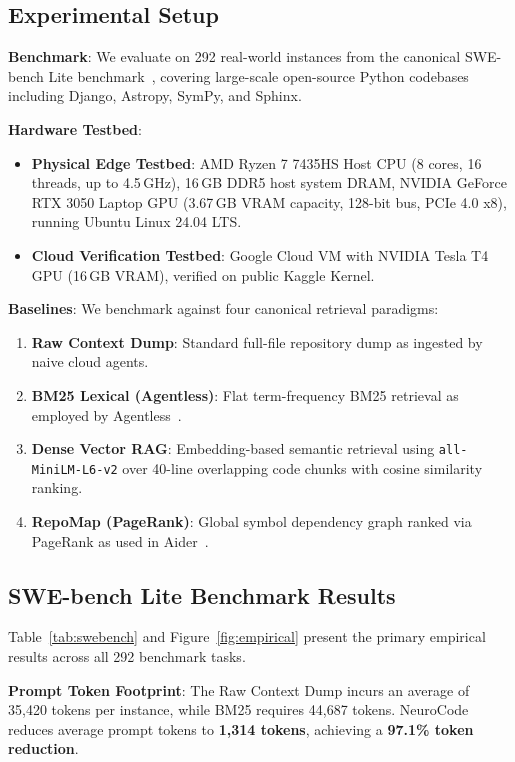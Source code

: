 \documentclass[journal]{IEEEtran}
\begin{document}
\subsection{Experimental Setup}

\textbf{Benchmark}: We evaluate on 292 real-world instances from the canonical SWE-bench Lite benchmark~\cite{jimenez2024swebench}, covering large-scale open-source Python codebases including Django, Astropy, SymPy, and Sphinx.

\textbf{Hardware Testbed}:
\begin{itemize}
    \item \textbf{Physical Edge Testbed}: AMD Ryzen 7 7435HS Host CPU (8 cores, 16 threads, up to 4.5\,GHz), 16\,GB DDR5 host system DRAM, NVIDIA GeForce RTX 3050 Laptop GPU (3.67\,GB VRAM capacity, 128-bit bus, PCIe 4.0 x8), running Ubuntu Linux 24.04 LTS.
    \item \textbf{Cloud Verification Testbed}: Google Cloud VM with NVIDIA Tesla T4 GPU (16\,GB VRAM), verified on public Kaggle Kernel.
\end{itemize}

\textbf{Baselines}: We benchmark against four canonical retrieval paradigms:
\begin{enumerate}
    \item \textbf{Raw Context Dump}: Standard full-file repository dump as ingested by naive cloud agents.
    \item \textbf{BM25 Lexical (Agentless)}: Flat term-frequency BM25 retrieval as employed by Agentless~\cite{xia2024agentless}.
    \item \textbf{Dense Vector RAG}: Embedding-based semantic retrieval using \texttt{all-MiniLM-L6-v2} over 40-line overlapping code chunks with cosine similarity ranking.
    \item \textbf{RepoMap (PageRank)}: Global symbol dependency graph ranked via PageRank as used in Aider~\cite{aider2024repomap}.
\end{enumerate}

\subsection{SWE-bench Lite Benchmark Results}

Table~\ref{tab:swebench} and Figure~\ref{fig:empirical} present the primary empirical results across all 292 benchmark tasks.

\textbf{Prompt Token Footprint}: The Raw Context Dump incurs an average of 35,420 tokens per instance, while BM25 requires 44,687 tokens. NeuroCode reduces average prompt tokens to \textbf{1,314 tokens}, achieving a \textbf{97.1\% token reduction}.
\end{document}
